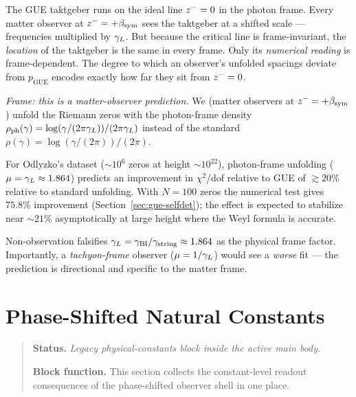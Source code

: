 \begin{remark}
The GUE taktgeber runs on the ideal line $z^-=0$ in the photon frame.
Every matter observer at $z^-=+\beta_{\mathrm{sym}}$ sees the taktgeber at a shifted
scale --- frequencies multiplied by $\gamma_L$.
But because the critical line is frame-invariant, the \emph{location} of
the taktgeber is the same in every frame.
Only its \emph{numerical reading} is frame-dependent.
The degree to which an observer's unfolded spacings deviate from
$p_{\mathrm{GUE}}$ encodes exactly how far they sit from $z^-=0$.
\end{remark}

\begin{corollary}
\label{cor:odlyzko}
\emph{Frame: this is a matter-observer prediction.}
We (matter observers at $z^-=+\beta_{\mathrm{sym}}$) unfold the Riemann zeros
with the photon-frame density $\rho_{\mathrm{ph}}(\gamma) =
\log(\gamma/(2\pi\gamma_L))/(2\pi\gamma_L)$ instead of the standard
$\rho(\gamma) = \log(\gamma/(2\pi))/(2\pi)$.

For Odlyzko's dataset (${\sim}10^6$ zeros at height ${\sim}10^{22}$),
photon-frame unfolding ($\mu=\gamma_L\approx 1.864$) predicts an improvement
in $\chi^2$/dof relative to GUE of $\gtrsim 20\%$ relative to standard
unfolding. With $N=100$ zeros the numerical test gives $75.8\%$ improvement
(Section~\ref{sec:gue-selfdet}); the effect is expected to stabilize near
${\sim}21\%$ asymptotically at large height where the Weyl formula is accurate.

Non-observation falsifies $\gamma_L=\gamma_{\mathrm{BI}}/\gamma_{\mathrm{string}}\approx 1.864$ as the physical
frame factor. Importantly, a \emph{tachyon-frame} observer ($\mu=1/\gamma_L$)
would see a \emph{worse} fit --- the prediction is directional and specific
to the matter frame.
\end{corollary}


\section{Phase-Shifted Natural Constants}
\begin{quote}\small
\noindent\textbf{Status.} \emph{Legacy physical-constants block inside the active main body.}\par
\noindent\textbf{Block function.} This section collects the constant-level readout consequences of the phase-shifted observer shell in one place.
\end{quote}
\label{sec:phase-constants}

